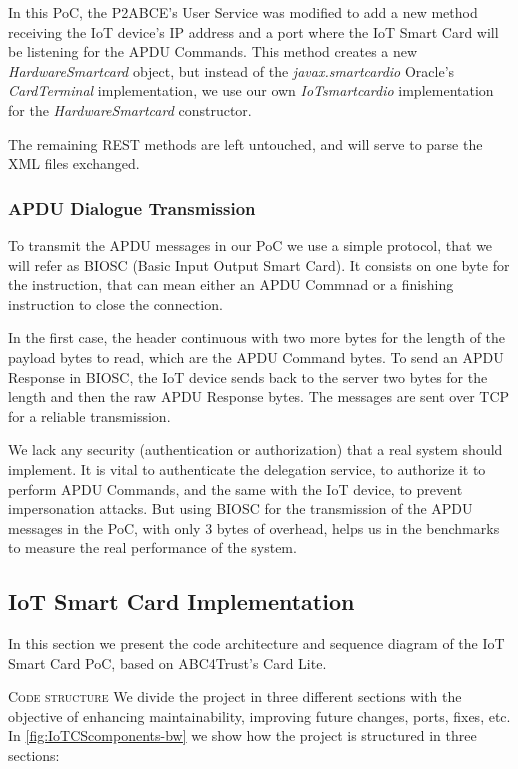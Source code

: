 \documentclass[journal]{IEEEtran}
\begin{document}
In this PoC, the P2ABCE's User Service was modified to add a new method receiving the IoT device's  IP address and a port where the IoT Smart Card will be listening for the APDU Commands.
This method creates a new \textit{HardwareSmartcard} object, but instead of the \textit{javax.smartcardio} Oracle's \textit{CardTerminal} implementation, we use our own \textit{IoTsmartcardio} implementation for the \textit{HardwareSmartcard} constructor.


The remaining REST methods are left untouched, and will serve to parse the XML files exchanged.

\hfil

\subsubsection{APDU Dialogue Transmission}


To transmit the APDU messages in our PoC we use a simple protocol, that we will refer as BIOSC (Basic Input Output Smart Card). It consists on one byte for the instruction, that can mean either an APDU Commnad or a finishing instruction to close the connection.

In the first case, the header continuous with two more bytes for the length of the payload bytes to read, which are the APDU Command bytes.
To send an APDU Response in BIOSC, the IoT device sends back to the server two bytes for the length and then the raw APDU Response bytes. The messages are sent over TCP for a reliable transmission.

We lack any security (authentication or authorization) that a real system should implement. It is vital to authenticate the delegation service, to authorize it to perform APDU Commands, and the same with the IoT device, to prevent impersonation attacks. But using BIOSC for the transmission of the APDU messages in the PoC, with only 3 bytes of overhead, helps us in the  benchmarks to measure the real performance of the system.


\subsection{IoT Smart Card Implementation}

In this section we present the code architecture and sequence diagram of the IoT Smart Card PoC, based on ABC4Trust's Card Lite.

\hfil

\textsc{Code structure}
We divide the project in three different sections with the objective of enhancing maintainability, improving future changes, ports, fixes, etc.
In \autoref{fig:IoTCScomponents-bw} we show how the project is structured in three sections:
\end{document}
